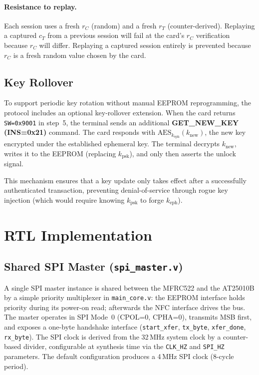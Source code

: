 \documentclass[manuscript,screen,nonacm]{acmart}
\begin{document}
\paragraph{Resistance to replay.}
Each session uses a fresh $r_C$ (random) and a fresh $r_T$
(counter-derived).
Replaying a captured $c_T$ from a previous session will fail at the
card's $r_C$ verification because $r_C$ will differ.
Replaying a captured session entirely is prevented because
$r_C$ is a fresh random value chosen by the card.

\subsection{Key Rollover}
\label{sec:security:rollover}

To support periodic key rotation without manual EEPROM reprogramming,
the protocol includes an optional key-rollover extension.
When the card returns \texttt{SW=0x9001} in step~5, the terminal sends
an additional \textbf{GET\_NEW\_KEY (INS=0x21)} command.
The card responds with $\text{AES}_{k_\text{eph}}(k_\text{new})$,
the new key encrypted under the established ephemeral key.
The terminal decrypts $k_\text{new}$, writes it to the EEPROM
(replacing $k_\text{psk}$), and only then asserts the unlock signal.

This mechanism ensures that a key update only takes effect after a
successfully authenticated transaction, preventing denial-of-service
through rogue key injection (which would require knowing $k_\text{psk}$
to forge $k_\text{eph}$).

\section{RTL Implementation}
\label{sec:impl}

\subsection{Shared SPI Master (\texttt{spi\_master.v})}
\label{sec:impl:spi}

A single SPI master instance is shared between the MFRC522 and the
AT25010B by a simple priority multiplexer in \texttt{main\_core.v}:
the EEPROM interface holds priority during its power-on read;
afterwards the NFC interface drives the bus.
The master operates in SPI Mode~0 (CPOL=0, CPHA=0), transmits MSB
first, and exposes a one-byte handshake interface (\texttt{start\_xfer},
\texttt{tx\_byte}, \texttt{xfer\_done}, \texttt{rx\_byte}).
The SPI clock is derived from the 32\,MHz system clock by a
counter-based divider, configurable at synthesis time via the
\texttt{CLK\_HZ} and \texttt{SPI\_HZ} parameters.
The default configuration produces a 4\,MHz SPI clock (8-cycle period).
\end{document}
